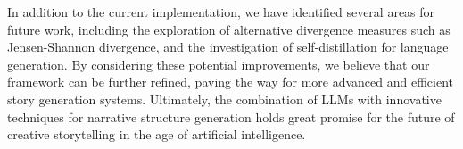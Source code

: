 \documentclass{article} %
\begin{document}
In addition to the current implementation, we have identified several areas for future work, including the exploration of alternative divergence measures such as Jensen-Shannon divergence, and the investigation of self-distillation for language generation. By considering these potential improvements, we believe that our framework can be further refined, paving the way for more advanced and efficient story generation systems. Ultimately, the combination of LLMs with innovative techniques for narrative structure generation holds great promise for the future of creative storytelling in the age of artificial intelligence.








\newpage
\appendix
\end{document}
